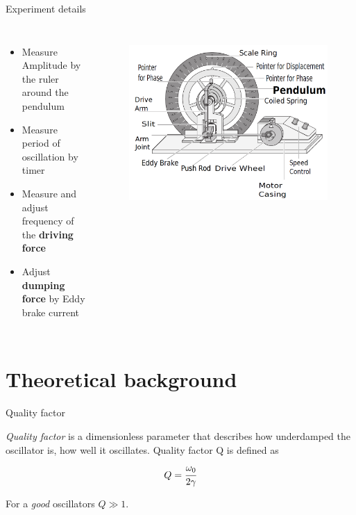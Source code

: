 \documentclass{beamer}
\begin{document}
\begin{frame}{Experiment details}
\begin{columns}
\begin{itemize}
    \item<1-> Measure Amplitude by the ruler around the pendulum
    \item<2-> Measure period of oscillation by timer
    \item<3-> Measure and adjust frequency of the \textbf{driving force}
    \item<4-> Adjust \textbf{dumping force} by Eddy brake current
\end{itemize}
\begin{figure}[t]
	\centering
	\includegraphics[width=1\linewidth]{images/pendulum_diagram.png}
	\label{fig:system-diagram}
\end{figure}
\end{columns}
\end{frame}

\section{Theoretical background}


\begin{frame}{Quality factor}
\begin{definition}
    	\textit{Quality factor} is a dimensionless parameter that describes how underdamped the oscillator is, how well it oscillates. Quality factor Q is defined as
	\begin{equation}\label{eq:q-factor}
	Q=\cfrac{\omega_0}{2\gamma}
	\end{equation}
\end{definition}

\bigskip
For a \textit{good} oscillators $Q \gg 1$. 
\end{frame}






\end{document}
